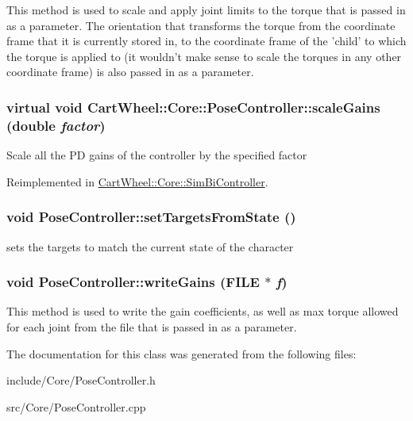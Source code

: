 \label{classCartWheel_1_1Core_1_1PoseController_aff8a23377cd8e222686cd762be41b19a}
This method is used to scale and apply joint limits to the torque that is passed in as a parameter. The orientation that transforms the torque from the coordinate frame that it is currently stored in, to the coordinate frame of the 'child' to which the torque is applied to (it wouldn't make sense to scale the torques in any other coordinate frame) is also passed in as a parameter. \hypertarget{classCartWheel_1_1Core_1_1PoseController_a943dbb6a3cc2ea8c4897cb4979983cea}{
\subsubsection[{scaleGains}]{\setlength{\rightskip}{0pt plus 5cm}virtual void CartWheel::Core::PoseController::scaleGains (double {\em factor})}}
\label{classCartWheel_1_1Core_1_1PoseController_a943dbb6a3cc2ea8c4897cb4979983cea}
Scale all the PD gains of the controller by the specified factor 

Reimplemented in \hyperlink{classCartWheel_1_1Core_1_1SimBiController_a07bdc28113f2c5d77ecd3d4b144faa8d}{CartWheel::Core::SimBiController}.

\hypertarget{classCartWheel_1_1Core_1_1PoseController_aba53f7222a9df8d1beec72536b711a81}{
\subsubsection[{setTargetsFromState}]{\setlength{\rightskip}{0pt plus 5cm}void PoseController::setTargetsFromState ()}}
\label{classCartWheel_1_1Core_1_1PoseController_aba53f7222a9df8d1beec72536b711a81}
sets the targets to match the current state of the character \hypertarget{classCartWheel_1_1Core_1_1PoseController_a4ab18da53609276376d80034f891cf46}{
\subsubsection[{writeGains}]{\setlength{\rightskip}{0pt plus 5cm}void PoseController::writeGains (FILE $\ast$ {\em f})}}
\label{classCartWheel_1_1Core_1_1PoseController_a4ab18da53609276376d80034f891cf46}
This method is used to write the gain coefficients, as well as max torque allowed for each joint from the file that is passed in as a parameter. 

The documentation for this class was generated from the following files:\begin{DoxyCompactItemize}
\item 
include/Core/PoseController.h\item 
src/Core/PoseController.cpp\end{DoxyCompactItemize}
